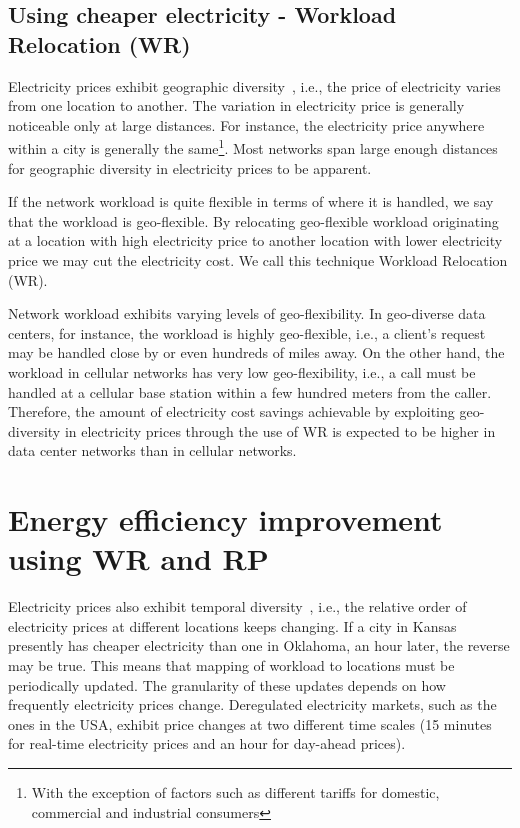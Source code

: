 \subsection{Using cheaper electricity - Workload Relocation (WR)}
Electricity prices exhibit geographic diversity~\cite{qureshiHotnets}, i.e., the price of electricity varies from one location to another. The variation in electricity price is generally noticeable only at large distances. For instance, the electricity price anywhere within a city is generally the same\footnote{With the exception of factors such as different tariffs for domestic, commercial and industrial consumers}. Most networks span large enough distances for geographic diversity in electricity prices to be apparent. 

If the network workload is quite flexible in terms of where it is handled, we say that the workload is geo-flexible. By relocating geo-flexible workload originating at a location with high electricity price to another location with lower electricity price we may cut the electricity cost. We call this technique Workload Relocation (WR). 

Network workload exhibits varying levels of geo-flexibility. In geo-diverse data centers, for instance, the workload is highly geo-flexible, i.e., a client's request may be handled close by or even hundreds of miles away. On the other hand, the workload in cellular networks has very low geo-flexibility, i.e., a call must be handled at a cellular base station within a few hundred meters from the caller. Therefore, the amount of electricity cost savings achievable by exploiting geo-diversity in electricity prices through the use of WR is expected to be higher in data center networks than in cellular networks.

\section{Energy efficiency improvement using WR and RP}

Electricity prices also exhibit temporal diversity~\cite{qureshiHotnets}, i.e., the relative order of electricity prices at different locations keeps changing. If a city in Kansas presently has cheaper electricity than one in Oklahoma, an hour later, the reverse may be true. This means that mapping of workload to locations must be periodically updated. The granularity of these updates depends on how frequently electricity prices change. Deregulated electricity markets, such as the ones in the USA, exhibit price changes at two different time scales (15 minutes for real-time electricity prices and an hour for day-ahead prices). 



